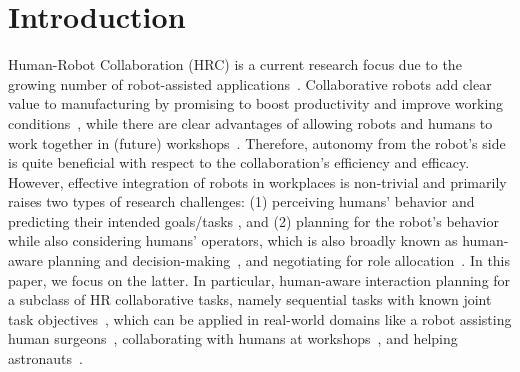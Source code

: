 \documentclass[letterpaper]{article} %
\begin{document}
\section{Introduction}
Human-Robot Collaboration (HRC) is a current research focus due to the growing number of robot-assisted applications~\cite{selvaggio2021autonomy}.
Collaborative robots add clear value to manufacturing by promising to boost productivity and improve working conditions~\cite{johannsmeier2016hierarchical}, while there are clear advantages of allowing robots and humans to work together in (future) workshops~\cite{hoffman2007effects,coupete2015gesture}.
Therefore, autonomy from the robot's side is quite beneficial with respect to the collaboration's efficiency and efficacy.  
However, effective integration of robots in workplaces is non-trivial and primarily raises two types of research challenges: (1) perceiving humans' behavior and predicting their intended goals/tasks \cite{cheng2020towards}, and (2) planning for the robot's behavior while also considering humans' operators, which is also broadly known as human-aware planning and decision-making~\cite{CirilloKS09,CramerKD21,UnhelkarLS20}, and negotiating for role allocation~\cite{roncone2017transparent}. 
In this paper, we focus on the latter. In particular, human-aware interaction planning for a subclass of HR collaborative tasks, namely sequential tasks with known joint task objectives~\cite{cheng2021human,UnhelkarLS19,buisan:hal-03684211}, which can be applied in real-world domains like a robot assisting human surgeons~\cite{jacob2013collaboration}, collaborating with humans at workshops~\cite{unhelkar2018human}, and helping astronauts~\cite{diftler2011robonaut}. 
\end{document}
